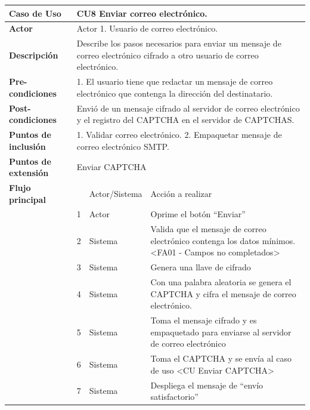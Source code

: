 \begin{longtable}[H]{| p{} | p{} |p{4cm}|p{5cm}|}
     \hline
     \textbf{Caso de Uso} &\multicolumn{3}{|l|}{CU8 Enviar correo electrónico.}\\
     \hline
     \textbf{Actor} & \multicolumn{3}{|l|}{Actor 1. Usuario de correo electrónico.}\\
     \hline
     \textbf{Descripción} & \multicolumn{3}{|p{10cm}|}{Describe los pasos necesarios para enviar un mensaje de correo electrónico cifrado a otro usuario de correo electrónico.}\\
     \hline
     \textbf{Pre-condiciones} & \multicolumn{3}{|p{10cm}|}{1. El usuario tiene que redactar un mensaje de correo electrónico que contenga la dirección del destinatario.}\\
     \hline
     \textbf{Post-condiciones} & \multicolumn{3}{|p{10cm}|}{Envió de un mensaje cifrado al servidor de correo electrónico y el registro del CAPTCHA en el servidor de CAPTCHAS.}\\
     \hline
     \textbf{Puntos de inclusión} & \multicolumn{3}{|p{10cm}|}{1. Validar correo electrónico. 2. Empaquetar mensaje de correo electrónico SMTP.}\\
     \hline
     \textbf{Puntos de extensión} & \multicolumn{3}{|l|}{Enviar CAPTCHA}\\
     \hline
     \textbf{Flujo principal} & & Actor/Sistema & Acción a realizar\\
     \hline
     & 1 & Actor & Oprime el botón ``Enviar''\\
     \hline
     & 2 & Sistema & Valida que el mensaje de correo electrónico contenga los datos mínimos.<FA01 - Campos no completados>\\
     \hline
     & 3 & Sistema & Genera una llave de cifrado\\
     \hline
     & 4 & Sistema & Con una palabra aleatoria se genera el CAPTCHA y cifra el mensaje de correo electrónico.\\
     \hline
     & 5 & Sistema & Toma el mensaje cifrado y es empaquetado para enviarse al servidor de correo electrónico\\
     \hline
     & 6 & Sistema & Toma el CAPTCHA  y se envía al caso de uso <CU Enviar CAPTCHA>\\
     \hline
     & 7 & Sistema & Despliega el mensaje de ``envío satisfactorio''\\
     \hline

\end{longtable}
